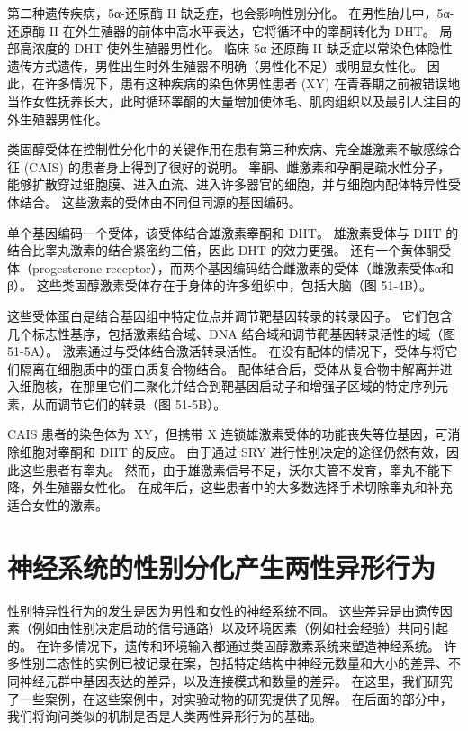 第二种遗传疾病，5α-还原酶 II 缺乏症，也会影响性别分化。 在男性胎儿中，5α-还原酶 II 在外生殖器的前体中高水平表达，它将循环中的睾酮转化为 DHT。 局部高浓度的 DHT 使外生殖器男性化。 临床 5α-还原酶 II 缺乏症以常染色体隐性遗传方式遗传，男性出生时外生殖器不明确（男性化不足）或明显女性化。 因此，在许多情况下，患有这种疾病的染色体男性患者 (XY) 在青春期之前被错误地当作女性抚养长大，此时循环睾酮的大量增加使体毛、肌肉组织以及最引人注目的外生殖器男性化。

类固醇受体在控制性分化中的关键作用在患有第三种疾病、完全雄激素不敏感综合征 (CAIS) 的患者身上得到了很好的说明。 睾酮、雌激素和孕酮是疏水性分子，能够扩散穿过细胞膜、进入血流、进入许多器官的细胞，并与细胞内配体特异性受体结合。 这些激素的受体由不同但同源的基因编码。

单个基因编码一个受体，该受体结合雄激素睾酮和 DHT。 雄激素受体与 DHT 的结合比睾丸激素的结合紧密约三倍，因此 DHT 的效力更强。 还有一个黄体酮受体（progesterone receptor），而两个基因编码结合雌激素的受体（雌激素受体α和β）。 这些类固醇激素受体存在于身体的许多组织中，包括大脑（图 51-4B）。

这些受体蛋白是结合基因组中特定位点并调节靶基因转录的转录因子。 它们包含几个标志性基序，包括激素结合域、DNA 结合域和调节靶基因转录活性的域（图 51-5A）。 激素通过与受体结合激活转录活性。 在没有配体的情况下，受体与将它们隔离在细胞质中的蛋白质复合物结合。 配体结合后，受体从复合物中解离并进入细胞核，在那里它们二聚化并结合到靶基因启动子和增强子区域的特定序列元素，从而调节它们的转录（图 51-5B）。

CAIS 患者的染色体为 XY，但携带 X 连锁雄激素受体的功能丧失等位基因，可消除细胞对睾酮和 DHT 的反应。 由于通过 SRY 进行性别决定的途径仍然有效，因此这些患者有睾丸。 然而，由于雄激素信号不足，沃尔夫管不发育，睾丸不能下降，外生殖器女性化。 在成年后，这些患者中的大多数选择手术切除睾丸和补充适合女性的激素。

\section{神经系统的性别分化产生两性异形行为}
性别特异性行为的发生是因为男性和女性的神经系统不同。 这些差异是由遗传因素（例如由性别决定启动的信号通路）以及环境因素（例如社会经验）共同引起的。 在许多情况下，遗传和环境输入都通过类固醇激素系统来塑造神经系统。 许多性别二态性的实例已被记录在案，包括特定结构中神经元数量和大小的差异、不同神经元群中基因表达的差异，以及连接模式和数量的差异。 在这里，我们研究了一些案例，在这些案例中，对实验动物的研究提供了见解。 在后面的部分中，我们将询问类似的机制是否是人类两性异形行为的基础。

